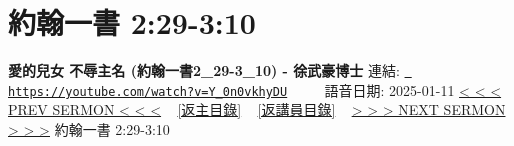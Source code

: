 \documentclass{book}
\begin{document}
\section{約翰一書 2:29-3:10}
\label{sec:Y_0n0vkhyDU}
\textbf{愛的兒女 不辱主名 (約翰一書2\_29-3\_10) - 徐武豪博士}
\newline
\newline
連結: \href{https://youtube.com/watch?v=Y_0n0vkhyDU}{\texttt{ https://youtube.com/watch?v=Y\_0n0vkhyDU}} ~~~~ 語音日期: 2025-01-11 
\newline
\newline
\hyperref[sec:pb5NDTZL6gI]{< < < PREV SERMON < < <}
~
\hyperlink{toc}{[返主目錄]}
~
\hyperref[ch:preacher4]{[返講員目錄]}
~
\hyperref[sec:K8E95o7ZcvU]{> > > NEXT SERMON > > >}
\newline
\newline
約翰一書 2:29-3:10
\newline
\end{document}
